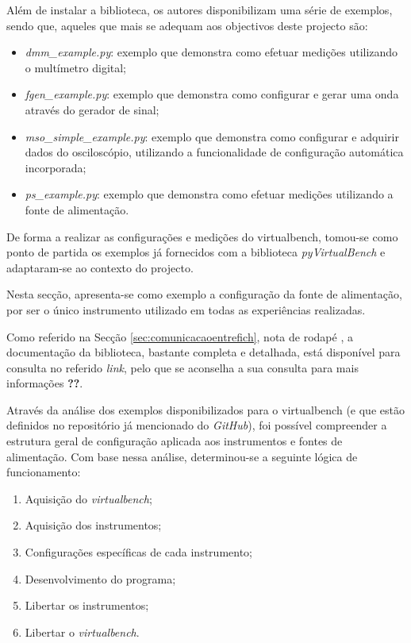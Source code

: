 Além de instalar a biblioteca, os autores disponibilizam uma série de exemplos, sendo que, aqueles que mais se adequam aos objectivos deste projecto são:
\begin{itemize}
	\item \textit{dmm\_example.py}: exemplo que demonstra como efetuar medições utilizando o multímetro digital;
	\item \textit{fgen\_example.py}: exemplo que demonstra como configurar e gerar uma onda através do gerador de sinal;
	\item \textit{mso\_simple\_example.py}: exemplo que demonstra como configurar e adquirir dados do osciloscópio, utilizando a funcionalidade de configuração automática incorporada;
	\item \textit{ps\_example.py}: exemplo que demonstra como efetuar medições utilizando a fonte de alimentação.
\end{itemize}

De forma a realizar as configurações e medições do \acrshort{virtualbench}, tomou-se como ponto de partida os exemplos já fornecidos com a biblioteca \textit{pyVirtualBench} e adaptaram-se ao contexto do projecto. 

Nesta secção, apresenta-se como exemplo a configuração da fonte de alimentação, por ser o único instrumento utilizado em todas as experiências realizadas. 

Como referido na Secção \ref{sec:comunicacaoentrefich}, nota de rodapé , a documentação da biblioteca, bastante completa e detalhada, está disponível para consulta no referido \textit{link}, pelo que se aconselha a sua consulta para mais informações \textbf{??}. 

Através da análise dos exemplos disponibilizados para o \acrshort{virtualbench} (e que estão definidos no repositório já mencionado do \textit{GitHub}), foi possível compreender a estrutura geral de configuração aplicada aos instrumentos e fontes de alimentação. Com base nessa análise, determinou-se a seguinte lógica de funcionamento:

\begin{enumerate}
	\label{item:logica}
	\item Aquisição do \textit{virtualbench};
	\item Aquisição dos instrumentos;
	\item Configurações específicas de cada instrumento;
	\item Desenvolvimento do programa;
	\item Libertar os instrumentos;
	\item Libertar o \textit{virtualbench}.
\end{enumerate}


